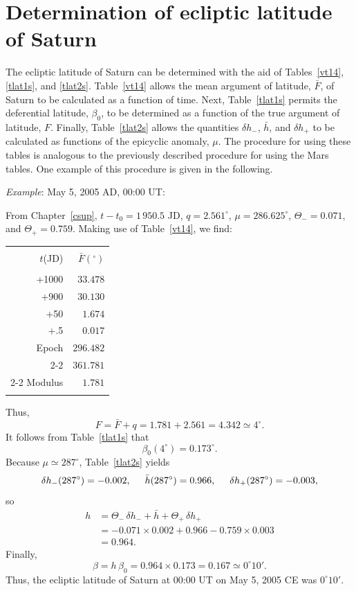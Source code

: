 \section{Determination of ecliptic latitude of Saturn}
The ecliptic latitude of Saturn can be determined with the aid of Tables~\ref{vt14}, \ref{tlat1s}, and \ref{tlat2s}. Table~\ref{vt14} allows
the mean argument of latitude, $\bar{F}$, of Saturn to be calculated as a function of
time. Next, Table~\ref{tlat1s} permits the deferential latitude, $\beta_0$, to
be determined as a function of the true argument of latitude, $F$. Finally, Table~\ref{tlat2s} allows the quantities
$\delta h_-$, $\bar{h}$, and $\delta h_+$ to be calculated as functions of the epicyclic
anomaly, $\mu$.  The procedure for using these tables is analogous to the previously described procedure for
using the Mars tables.
One example of this procedure is given in the following.

\begin{center}
{\em Example}: May 5, 2005 AD, 00:00 UT:
\end{center}
From Chapter~\ref{csup}, $t-t_0=1\,950.5$ JD, 
$q= 2.561^\circ$,  $\mu= 286.625^\circ$, $\Theta_-=0.071$, and
$\Theta_+ = 0.759$.
 Making use of
Table~\ref{vt14}, we find:
\begin{center}
\begin{tabular}{rr}
&\\
$t$(JD) & $\bar{F}(^\circ)$\\[-2ex]
&\\
+1000 & $33.478$ \\
+900 & $30.130$\\
+50 & $1.674$ \\
+.5 & $0.017$\\
Epoch & $296.482$ \\\cline{2-2}
&$361.781$ \\\cline{2-2}
Modulus & $1.781$ \\ 
&\\
\end{tabular}
\end{center}
Thus,
$$
F = \bar{F} + q =1.781+2.561 = 4.342\simeq 4^\circ.
$$
It follows from Table~\ref{tlat1s} that
$$
\beta_0(4^\circ) = 0.173^\circ.
$$
Because $\mu\simeq 287^\circ$, Table~\ref{tlat2s} yields
$$
\delta h_-(287^\circ) = -0.002,\mbox{\hspace{0.5cm}}\bar{h}(287^\circ)=0.966, \mbox{\hspace{0.5cm}}\delta h_+(287^\circ) = -0.003,
$$
so
\begin{align*}
h &= \Theta_-\,\delta h_- + \bar{h}+\Theta_+\,\delta h_+\\[0.5ex]
& = -0.071\times 0.002 +0.966-0.759\times 0.003 \\[0.5ex]
&= 0.964.
\end{align*}
Finally,
$$
\beta = h\,\beta_0 = 0.964\times 0.173 = 0.167 \simeq 0^\circ 10'.
$$
Thus,
the ecliptic latitude of Saturn at 00:00 UT on May 5, 2005 CE was $0^\circ 10'$.

